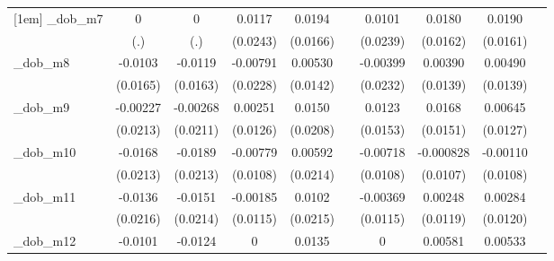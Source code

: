 \begin{table}[htbp]
\begin{tabular}{l*{9}{c}}
[1em]
\_dob\_m7     &           0         &           0         &      0.0117         &      0.0194         &                     &      0.0101         &      0.0180         &      0.0190         &                     \\
            &         (.)         &         (.)         &    (0.0243)         &    (0.0166)         &                     &    (0.0239)         &    (0.0162)         &    (0.0161)         &                     \\
[1em]
\_dob\_m8     &     -0.0103         &     -0.0119         &    -0.00791         &     0.00530         &                     &    -0.00399         &     0.00390         &     0.00490         &                     \\
            &    (0.0165)         &    (0.0163)         &    (0.0228)         &    (0.0142)         &                     &    (0.0232)         &    (0.0139)         &    (0.0139)         &                     \\
[1em]
\_dob\_m9     &    -0.00227         &    -0.00268         &     0.00251         &      0.0150         &                     &      0.0123         &      0.0168         &     0.00645         &                     \\
            &    (0.0213)         &    (0.0211)         &    (0.0126)         &    (0.0208)         &                     &    (0.0153)         &    (0.0151)         &    (0.0127)         &                     \\
[1em]
\_dob\_m10    &     -0.0168         &     -0.0189         &    -0.00779         &     0.00592         &                     &    -0.00718         &   -0.000828         &    -0.00110         &                     \\
            &    (0.0213)         &    (0.0213)         &    (0.0108)         &    (0.0214)         &                     &    (0.0108)         &    (0.0107)         &    (0.0108)         &                     \\
[1em]
\_dob\_m11    &     -0.0136         &     -0.0151         &    -0.00185         &      0.0102         &                     &    -0.00369         &     0.00248         &     0.00284         &                     \\
            &    (0.0216)         &    (0.0214)         &    (0.0115)         &    (0.0215)         &                     &    (0.0115)         &    (0.0119)         &    (0.0120)         &                     \\
[1em]
\_dob\_m12    &     -0.0101         &     -0.0124         &           0         &      0.0135         &                     &           0         &     0.00581         &     0.00533         &                     \\

\end{tabular}
\end{table}
